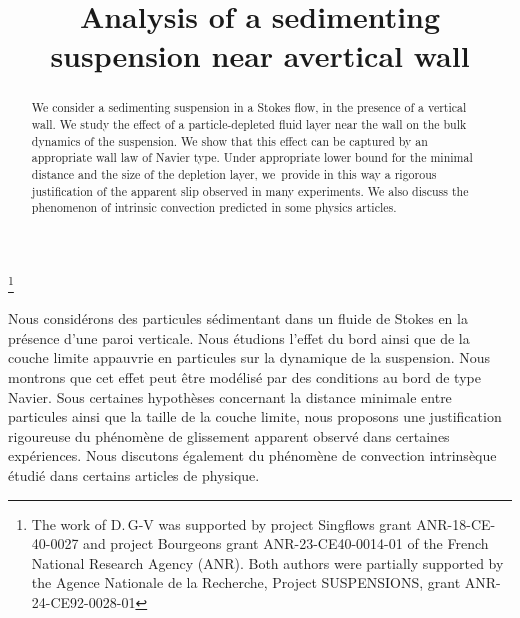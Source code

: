 \documentclass[JEP,XML,SOM,Unicode,NoEqCountersInSection,published]{cedram}
\theoremstyle{plain}
\theoremstyle{definition}
\begin{document}
\title{Analysis of a sedimenting suspension near a\nobreakspace vertical wall}

\author[\initial{D.} \lastname{Gérard-Varet}]{ }
\address{Université Paris Cité and Sorbonne Université, CNRS, IMJ-PRG,\\ F-75013 Paris, France}

\author[\initial{A.} \lastname{Mecherbet}]{ }
\address{Université Paris Cité and Sorbonne Université, CNRS, IMJ-PRG,\\ F-75013 Paris, France}

\thanks{The work of D.\,G-V was supported by project Singflows grant ANR-18-CE-40-0027 and project Bourgeons grant ANR-23-CE40-0014-01 of the French National Research Agency (ANR). Both authors were partially supported by the Agence Nationale de la Recherche, Project SUSPENSIONS, grant ANR-24-CE92-0028-01}

\begin{abstract}
We consider a sedimenting suspension in a Stokes flow, in the presence of a vertical wall. We study the effect of a particle-depleted fluid layer near the wall on the bulk dynamics of the suspension. We show that this effect can be captured by an appropriate wall law of Navier type. Under appropriate lower bound for the minimal distance and the size of the depletion layer, we~provide in this way a rigorous justification of the apparent slip observed in many experiments. We also discuss the phenomenon of intrinsic convection predicted in some physics articles.
\end{abstract}





\begin{altabstract}
Nous considérons des particules sédimentant dans un fluide de Stokes en la présence d'une paroi verticale. Nous étudions l'effet du bord ainsi que de la couche limite appauvrie en particules sur la dynamique de la suspension. Nous montrons que cet effet peut être modélisé par des conditions au bord de type Navier. Sous certaines hypothèses concernant la distance minimale entre particules ainsi que la taille de la couche limite, nous proposons une justification rigoureuse du phénomène de glissement apparent observé dans certaines expériences. Nous discutons également du phénomène de convection intrinsèque étudié dans certains articles de physique.
\end{altabstract}
\end{document}
